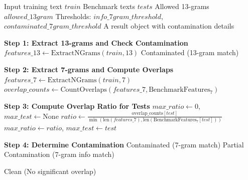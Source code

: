 \documentclass[11pt]{article}
\begin{document}
\begin{algorithm}
\caption{Decontamination Algorithm}
\label{alg:decontamination}
\begin{algorithmic}[1]

\Require
\Statex Input training text $train$
\Statex Benchmark texts $tests$
\Statex Allowed 13-grams $allowed\_13gram$
\Statex Thresholds: $info\_7gram\_threshold$, $contaminated\_7gram\_threshold$
\Ensure
\Statex A result object with contamination details

    \State \textbf{Step 1: Extract 13-grams and Check Contamination}
    \State $features\_13 \gets \text{ExtractNGrams}(train, 13)$
            \State \Return Contaminated (13-gram match)
        \EndIf
    \EndFor

    \State \textbf{Step 2: Extract 7-grams and Compute Overlaps}
    \State $features\_7 \gets \text{ExtractNGrams}(train, 7)$
    \State $overlap\_counts \gets \text{CountOverlaps}(features\_7, \text{BenchmarkFeatures}_{7})$

    \State \textbf{Step 3: Compute Overlap Ratio for Tests}
    \State $max\_ratio \gets 0$, $max\_test \gets \text{None}$
        \State $ratio \gets \frac{\text{overlap\_counts}[test]}{\min(\text{len}(features\_7), \text{len}(\text{BenchmarkFeatures}_{7}[test]))}$
            \State $max\_ratio \gets ratio$, $max\_test \gets test$
        \EndIf
    \EndFor

    \State \textbf{Step 4: Determine Contamination}
            \State \Return Contaminated (7-gram match)
        \Else
            \State \Return Partial Contamination (7-gram info match)
        \EndIf
    \EndIf

    \State \Return Clean (No significant overlap)

\EndProcedure

\end{algorithmic}\label{algo_dedup}
\end{algorithm}
\end{document}
